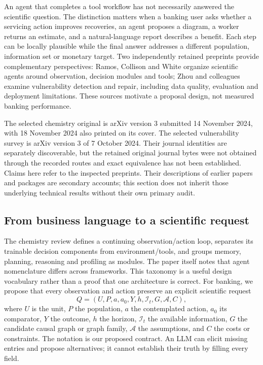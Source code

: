 An agent that completes a tool workflow has not necessarily answered the scientific question. The distinction matters when a banking user asks whether a servicing action improves recoveries, an agent proposes a diagram, a worker returns an estimate, and a natural-language report describes a benefit. Each step can be locally plausible while the final answer addresses a different population, information set or monetary target. Two independently retained preprints provide complementary perspectives: Ramos, Collison and White organize scientific agents around observation, decision modules and tools; Zhou and colleagues examine vulnerability detection and repair, including data quality, evaluation and deployment limitations. These sources motivate a proposal design, not measured banking performance.~\citep{exec25_cow_chemistry,exec25_cow_vulnerability}

The selected chemistry original is arXiv version 3 submitted 14 November 2024, with 18 November 2024 also printed on its cover. The selected vulnerability survey is arXiv version 3 of 7 October 2024. Their journal identities are separately discoverable, but the retained original journal bytes were not obtained through the recorded routes and exact equivalence has not been established. Claims here refer to the inspected preprints. Their descriptions of earlier papers and packages are secondary accounts; this section does not inherit those underlying technical results without their own primary audit.~\citep{exec25_cow_chemistry,exec25_cow_vulnerability}

\subsection{From business language to a scientific request}

The chemistry review defines a continuing observation/action loop, separates its trainable decision components from environment/tools, and groups memory, planning, reasoning and profiling as modules. The paper itself notes that agent nomenclature differs across frameworks. This taxonomy is a useful design vocabulary rather than a proof that one architecture is correct. For banking, we propose that every observation and action preserve an explicit scientific request
\[
 Q=(U,P,a,a_0,Y,h,\mathcal I_t,G,\mathcal A,C),
\]
where $U$ is the unit, $P$ the population, $a$ the contemplated action, $a_0$ its comparator, $Y$ the outcome, $h$ the horizon, $\mathcal I_t$ the available information, $G$ the candidate causal graph or graph family, $\mathcal A$ the assumptions, and $C$ the costs or constraints. The notation is our proposed contract. An LLM can elicit missing entries and propose alternatives; it cannot establish their truth by filling every field.~\citep{exec25_cow_chemistry,exec25_cow_reference}

